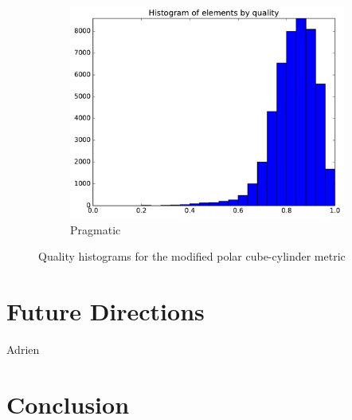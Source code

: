 \documentclass[3p,times,procedia,number]{elsarticle}
\begin{document}
\begin{figure}
\begin{subfigure}{.24\textwidth}
\includegraphics[width=\textwidth]{pragmatic-cube-cylinder-polar-2-quality.pdf}
\caption{Pragmatic}
\end{subfigure}
\caption{Quality histograms for the modified polar cube-cylinder metric}
\label{fig:cube-cylinder-polar-2-qualities}
\end{figure}

\section{Future Directions}
{\color{red} Adrien}

\section{Conclusion}



\end{document}
